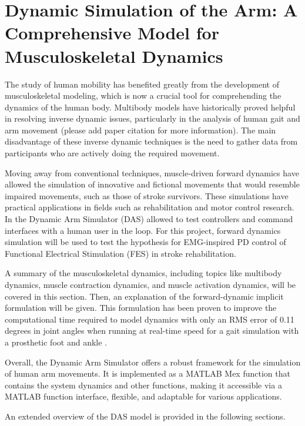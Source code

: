\section{Dynamic Simulation of the Arm: A Comprehensive Model for Musculoskeletal Dynamics}
The study of human mobility has benefited greatly from the development of musculoskeletal modeling, which is now a crucial tool for comprehending the dynamics of the human body. Multibody models have historically proved helpful in resolving inverse dynamic issues, particularly in the analysis of human gait and arm movement (please add paper citation for more information). The main disadvantage of these inverse dynamic techniques is the need to gather data from participants who are actively doing the required movement.

Moving away from conventional techniques, muscle-driven forward dynamics have allowed the simulation of innovative and fictional movements that would resemble impaired movements, such as those of stroke survivors. These simulations have practical applications in fields such as rehabilitation and motor control research. In \cite{IMP} the Dynamic Arm Simulator (DAS) allowed to test controllers and command interfaces with a human user in the loop. For this project, forward dynamics simulation will be used to test the hypothesis for EMG-inspired PD control of Functional Electrical Stimulation (FES) in stroke rehabilitation. 

A summary of the musculoskeletal dynamics, including topics like multibody dynamics, muscle contraction dynamics, and muscle activation dynamics, will be covered in this section. Then, an explanation of the forward-dynamic implicit formulation will be given. This formulation has been proven to improve the computational time required to model dynamics with only an RMS error of 0.11 degrees in joint angles when running at real-time speed for a gait simulation with a prosthetic foot and ankle \cite{IMP}.

Overall, the Dynamic Arm Simulator offers a robust framework for the simulation of human arm movements. It is implemented as a MATLAB Mex function that contains the system dynamics and other functions, making it accessible via a MATLAB function interface, flexible, and adaptable for various applications. 

An extended overview of the DAS model is provided in the following sections.

